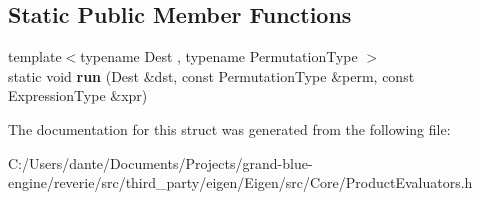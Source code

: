 \subsection*{Static Public Member Functions}
\begin{DoxyCompactItemize}
\item 
\mbox{\label{struct_eigen_1_1internal_1_1permutation__matrix__product_3_01_expression_type_00_01_side_00_01_t00744509fe9d67128974220180aea840_a3210a391ac134c77d74d8542d6ed57dd}} 
{\footnotesize template$<$typename Dest , typename Permutation\+Type $>$ }\\static void {\bfseries run} (Dest \&dst, const Permutation\+Type \&perm, const Expression\+Type \&xpr)
\end{DoxyCompactItemize}


The documentation for this struct was generated from the following file\+:\begin{DoxyCompactItemize}
\item 
C\+:/\+Users/dante/\+Documents/\+Projects/grand-\/blue-\/engine/reverie/src/third\+\_\+party/eigen/\+Eigen/src/\+Core/Product\+Evaluators.\+h\end{DoxyCompactItemize}
